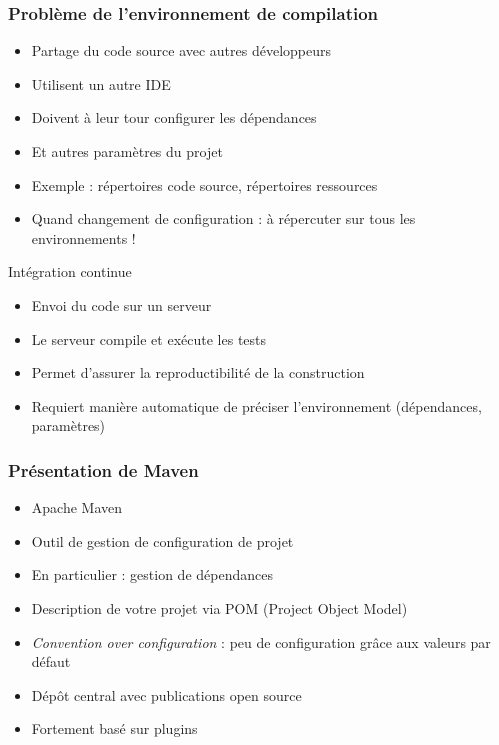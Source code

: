 \documentclass[english, french]{beamer}
\begin{document}
\begin{frame}
	\frametitle{Problème de l’environnement de compilation}
	\begin{itemize}
		\item Partage du code source avec autres développeurs
		\item Utilisent un autre IDE
		\item Doivent à leur tour configurer les dépendances
		\item Et autres paramètres du projet
		\item Exemple : répertoires code source, répertoires ressources
		\item Quand changement de configuration : à répercuter sur tous les environnements !
	\end{itemize}
	\begin{block}{Intégration continue}
		\begin{itemize}
			\item Envoi du code sur un serveur
			\item Le serveur compile et exécute les tests
			\item Permet d’assurer la reproductibilité de la construction
			\item Requiert manière automatique de préciser l’environnement (dépendances, paramètres)
		\end{itemize}
	\end{block}
\end{frame}

\begin{frame}
	\frametitle{Présentation de Maven}
	\begin{itemize}
		\item Apache Maven
		\item Outil de gestion de configuration de projet
		\item En particulier : gestion de dépendances
		\item Description de votre projet via POM (Project Object Model)
		\item \emph{Convention over configuration} : peu de configuration grâce aux valeurs par défaut
		\item Dépôt central avec publications open source
		\item Fortement basé sur plugins
	\end{itemize}
\end{frame}
\end{document}
